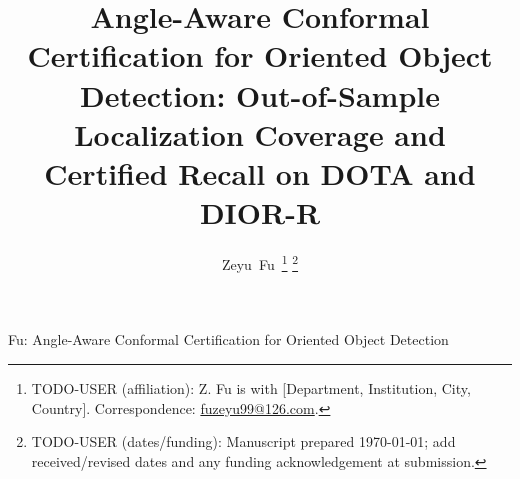 \documentclass[journal]{IEEEtran}
\begin{document}
\title{Angle-Aware Conformal Certification for Oriented Object Detection:
Out-of-Sample Localization Coverage and Certified Recall on DOTA and DIOR-R}

\author{Zeyu~Fu\,%
\thanks{TODO-USER (affiliation): Z. Fu is with [Department, Institution, City,
Country]. Correspondence: \href{mailto:fuzeyu99@126.com}{fuzeyu99@126.com}.}%
\thanks{TODO-USER (dates/funding): Manuscript prepared \today; add received/revised
dates and any funding acknowledgement at submission.}}

%
{Fu: Angle-Aware Conformal Certification for Oriented Object Detection}

\maketitle
\end{document}

